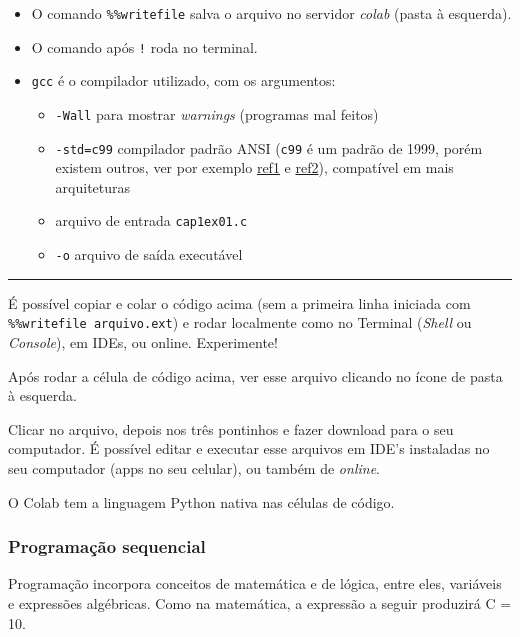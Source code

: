 \documentclass[12pt,a4paper]{article}
\providecommand{\tightlist}{%
      \setlength{\itemsep}{0pt}\setlength{\parskip}{0pt}}
\begin{document}
    \begin{itemize}
\tightlist
\item
  O comando \texttt{\%\%writefile} salva o arquivo no servidor
  \emph{colab} (pasta à esquerda).
\item
  O comando após \texttt{!} roda no terminal.
\item
  \texttt{gcc} é o compilador utilizado, com os argumentos:

  \begin{itemize}
  \tightlist
  \item
    \texttt{-Wall} para mostrar \emph{warnings} (programas mal feitos)
  \item
    \texttt{-std=c99} compilador padrão ANSI (\texttt{c99} é um padrão
    de 1999, porém existem outros, ver por exemplo
    \href{en.wikipedia.org/wiki/ANSI_C}{ref1} e
    \href{https://pt.wikipedia.org/wiki/Biblioteca_padr\%C3\%A3o_do_C}{ref2}),
    compatível em mais arquiteturas
  \item
    arquivo de entrada \texttt{cap1ex01.c}
  \item
    \texttt{-o} arquivo de saída executável
  \end{itemize}
\end{itemize}

    \begin{center}\rule{0.5\linewidth}{0.5pt}\end{center}

É possível copiar e colar o código acima (sem a primeira linha iniciada
com \texttt{\%\%writefile\ arquivo.ext}) e rodar localmente como no
Terminal (\emph{Shell} ou \emph{Console}), em IDEs, ou online.
Experimente!

    Após rodar a célula de código acima, ver esse arquivo clicando no ícone
de pasta à esquerda.

    Clicar no arquivo, depois nos três pontinhos e fazer download para o seu
computador. É possível editar e executar esse arquivos em IDE's
instaladas no seu computador (apps no seu celular), ou também de
\emph{online}.

    O Colab tem a linguagem Python nativa nas células de código.

    \hypertarget{programauxe7uxe3o-sequencial}{%
\subsubsection{Programação
sequencial}\label{programauxe7uxe3o-sequencial}}

    Programação incorpora conceitos de matemática e de lógica, entre eles,
variáveis e expressões algébricas. Como na matemática, a expressão a
seguir produzirá C = 10.
\end{document}
